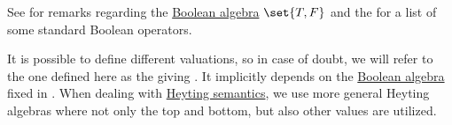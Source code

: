 \begin{comments}
  \item See  for remarks regarding the \hyperref[def:boolean_algebra]{Boolean algebra} \( \set{ T, F } \) and the  for a list of some standard Boolean operators.
  \item It is possible to define different valuations, so in case of doubt, we will refer to the one defined here as the  giving . It implicitly depends on the \hyperref[def:boolean_algebra]{Boolean algebra} fixed in . When dealing with \hyperref[def:propositional_heyting_algebra_semantics]{Heyting semantics}, we use more general Heyting algebras where not only the top and bottom, but also other values are utilized.
\end{comments}

